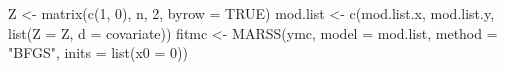 \begin{Schunk}
\begin{Sinput}
 Z <- matrix(c(1, 0), n, 2, byrow = TRUE)
 mod.list <- c(mod.list.x, mod.list.y, list(Z = Z, d = covariate))
 fitmc <- MARSS(ymc, model = mod.list, method = "BFGS", inits = list(x0 = 0))
\end{Sinput}
\end{Schunk}

